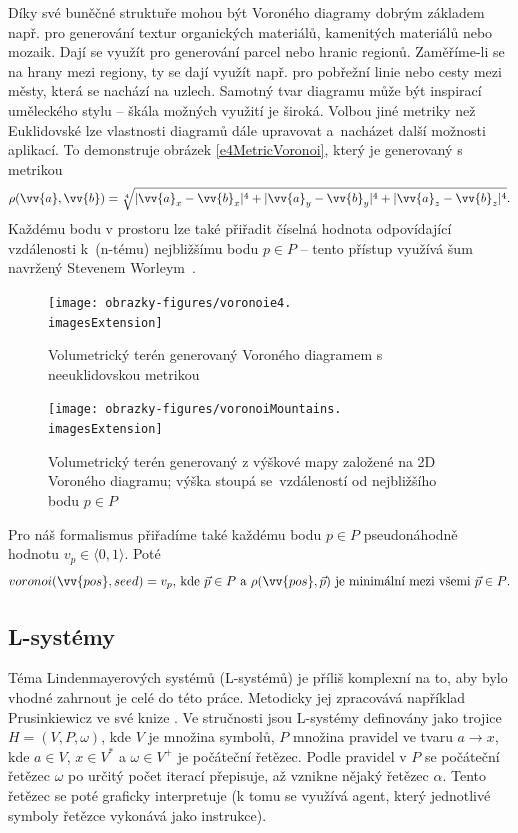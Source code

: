 Díky své buněčné struktuře mohou být Voroného diagramy dobrým základem např. pro generování textur organických materiálů, kamenitých materiálů nebo mozaik. Dají se využít pro generování parcel nebo hranic regionů. Zaměříme-li se na hrany mezi regiony, ty se dají využít např. pro pobřežní linie nebo cesty mezi městy, která se nachází na uzlech. Samotný tvar diagramu může být inspirací uměleckého stylu -- škála možných využití je široká. Volbou jiné metriky než Euklidovské lze vlastnosti diagramů dále upravovat a~nacházet další možnosti aplikací. To demonstruje obrázek \ref{e4MetricVoronoi}, který je generovaný s metrikou
\begin{equation}
	\rho(\vv{a}, \vv{b}) = \sqrt[4]{|\vv{a}_x - \vv{b}_x|^4 + |\vv{a}_y - \vv{b}_y|^4 + |\vv{a}_z - \vv{b}_z|^4} \text{.}
\end{equation}
Každému bodu v prostoru lze také přiřadit číselná hodnota odpovídající vzdálenosti \mbox{k~(n-tému)} nejbližšímu bodu $p \in P$ -- tento přístup využívá šum navržený Stevenem Worleym~\cite{Worley1996}.

\begin{figure}[H]
	\centering
	\begin{minipage}[t]{0.48\textwidth}
		\centering
		\texttt{[image: obrazky-figures/voronoie4.\\imagesExtension]}
		\caption[]{Volumetrický terén generovaný Voroného diagramem s neeuklidovskou metrikou}
		\label{e4MetricVoronoi}
	\end{minipage}
	\hfill
	\begin{minipage}[t]{0.48\textwidth}
		\centering
		\texttt{[image: obrazky-figures/voronoiMountains.\\imagesExtension]}
		\caption{Volumetrický terén generovaný z výškové mapy založené na 2D Voroného diagramu; výška stoupá se~vzdáleností od nejbližšího bodu $p \in P$}
		\label{mountainsVoronoi}
	\end{minipage}
\end{figure}

Pro náš formalismus přiřadíme také každému bodu $p \in P$ pseudonáhodně hodnotu $v_p \in \langle0,1\rangle$. Poté
\begin{equation}
	voronoi(\vv{pos}, seed) = v_p \text{, kde $\vec{p} \in P$ a $\rho(\vv{pos}, \vec{p})$ je minimální mezi všemi $\vec{p} \in P$.}
\end{equation}

\subsection{L-systémy}
Téma Lindenmayerových systémů (L-systémů) je příliš komplexní na to, aby bylo vhodné zahrnout je celé do této práce. Metodicky jej zpracovává například Prusinkiewicz ve své knize \cite{OstebeeArnold1997TABo}. Ve stručnosti jsou L-systémy definovány jako trojice $H = (V, P, \omega)$, kde $V$ je množina symbolů, $P$ množina pravidel ve tvaru $a \rightarrow x$, kde $a \in V$, $x \in V^*$ a $\omega \in V^+$ je počáteční řetězec. Podle pravidel v $P$ se počáteční řetězec $\omega$ po určitý počet iterací přepisuje, až vznikne nějaký řetězec $\alpha$. Tento řetězec se poté graficky interpretuje (k tomu se využívá agent, který jednotlivé symboly řetězce vykonává jako instrukce).

